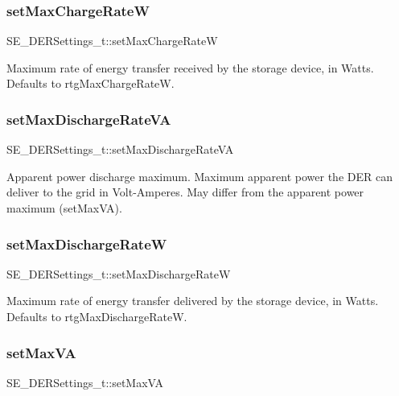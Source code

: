 \subsubsection{\texorpdfstring{set\+Max\+Charge\+RateW}{setMaxChargeRateW}}
{\footnotesize\ttfamily S\+E\+\_\+\+D\+E\+R\+Settings\+\_\+t\+::set\+Max\+Charge\+RateW}

Maximum rate of energy transfer received by the storage device, in Watts. Defaults to rtg\+Max\+Charge\+RateW. \mbox{\label{group__DERSettings_ga6b44491a30152c3df1db3ae063bd1fe2}} 
\subsubsection{\texorpdfstring{set\+Max\+Discharge\+Rate\+VA}{setMaxDischargeRateVA}}
{\footnotesize\ttfamily S\+E\+\_\+\+D\+E\+R\+Settings\+\_\+t\+::set\+Max\+Discharge\+Rate\+VA}

Apparent power discharge maximum. Maximum apparent power the D\+ER can deliver to the grid in Volt-\/\+Amperes. May differ from the apparent power maximum (set\+Max\+VA). \mbox{\label{group__DERSettings_ga3d68c7285c446c74efb76158a8d0ec2d}} 
\subsubsection{\texorpdfstring{set\+Max\+Discharge\+RateW}{setMaxDischargeRateW}}
{\footnotesize\ttfamily S\+E\+\_\+\+D\+E\+R\+Settings\+\_\+t\+::set\+Max\+Discharge\+RateW}

Maximum rate of energy transfer delivered by the storage device, in Watts. Defaults to rtg\+Max\+Discharge\+RateW. \mbox{\label{group__DERSettings_ga401a2c7fda7fbea901c15746d63877d9}} 
\subsubsection{\texorpdfstring{set\+Max\+VA}{setMaxVA}}
{\footnotesize\ttfamily S\+E\+\_\+\+D\+E\+R\+Settings\+\_\+t\+::set\+Max\+VA}

